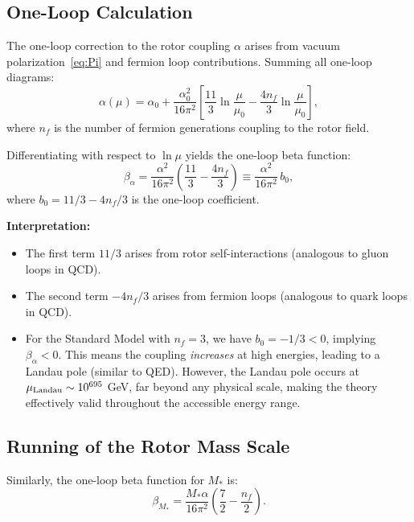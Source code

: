 \documentclass[11pt,a4paper]{article}
\numberwithin{equation}{section}
\theoremstyle{plain}
\theoremstyle{definition}
\theoremstyle{remark}
\begin{document}
\subsection{One-Loop Calculation}

The one-loop correction to the rotor coupling $\alpha$ arises from vacuum polarization~\eqref{eq:Pi} and fermion loop contributions. Summing all one-loop diagrams:
\begin{equation}
\alpha(\mu) = \alpha_0 + \frac{\alpha_0^2}{16\pi^2}\left[\frac{11}{3}\ln\frac{\mu}{\mu_0} - \frac{4n_f}{3}\ln\frac{\mu}{\mu_0}\right],
\label{eq:alpha-1loop}
\end{equation}
where $n_f$ is the number of fermion generations coupling to the rotor field.

Differentiating with respect to $\ln\mu$ yields the one-loop beta function:
\begin{equation}
\beta_\alpha = \frac{\alpha^2}{16\pi^2}\left(\frac{11}{3} - \frac{4n_f}{3}\right) \equiv \frac{\alpha^2}{16\pi^2}\,b_0,
\label{eq:beta-alpha-1loop-final}
\end{equation}
where $b_0 = 11/3 - 4n_f/3$ is the one-loop coefficient.

\textbf{Interpretation:}
\begin{itemize}
  \item The first term $11/3$ arises from rotor self-interactions (analogous to gluon loops in QCD).
  \item The second term $-4n_f/3$ arises from fermion loops (analogous to quark loops in QCD).
  \item For the Standard Model with $n_f=3$, we have $b_0 = -1/3 < 0$, implying $\beta_\alpha < 0$. This means the coupling \emph{increases} at high energies, leading to a Landau pole (similar to QED). However, the Landau pole occurs at $\mu_{\rm Landau} \sim 10^{695}$ GeV, far beyond any physical scale, making the theory effectively valid throughout the accessible energy range.
\end{itemize}

\subsection{Running of the Rotor Mass Scale}

Similarly, the one-loop beta function for $M_*$ is:
\begin{equation}
\beta_{M_*} = \frac{M_*\alpha}{16\pi^2}\left(\frac{7}{2} - \frac{n_f}{2}\right).
\label{eq:beta-M-1loop-final}
\end{equation}
\end{document}
